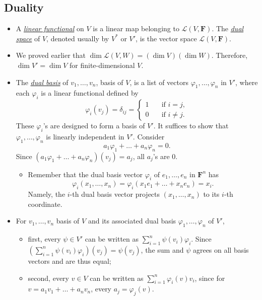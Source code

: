\documentclass[11pt]{article}
\newcommand{\df}[1]{\ul{\textit{\textsf{#1}}}}
\newcommand{\F}{\mathbf{F}}
\renewcommand{\d}{\dim}
\newcommand{\LVW}{\mathcal{L}(V,W)}
\renewcommand{\phi}{\varphi}
\begin{document}
\subsection{Duality}
\begin{itemize}
    \item A \df{linear functional} on $V$ is a linear map belonging to $\mathcal{L}(V,\F)$. The \df{dual space} of $V$, denoted usually by $V^*$ or $V'$, is the vector space $\mathcal{L}(V,\F)$.
    \item We proved earlier that $\d \LVW = (\d V)(\d W)$. Therefore, $\d V' = \d V$ for finite-dimensional $V$.
    \item The \df{dual basis} of $v_1,\dots,v_n$, basis of $V$, is a list of vectors $\phi_1,\dots,\phi_n$ in $V'$, where each $\phi_i$ is a linear functional defined by
    \begin{equation*}
        \phi_i(v_j) = \delta_{ij} = \left\{
            \begin{array}{rl}
                1 \quad & \text{if } i = j, \\
                0 \quad & \text{if } i \not= j.
            \end{array}
        \right.
    \end{equation*}
    These $\phi_i$'s are designed to form a basis of $V'$. It suffices to show that $\phi_1,\dots,\phi_n$ is linearly independent in $V'$. Consider $$a_1\phi_1+\dots+a_n\phi_n=0.$$ Since $(a_1\phi_1+\dots+a_n\phi_n)(v_j)=a_j$, all $a_j$'s are 0.
    \begin{itemize}
        \item Remember that the dual basis vector $\phi_i$ of $e_1,\dots,e_n$ in $\F^n$ has $$\phi_i(x_1,\dots,x_n)=\phi_i(x_1e_1+\dots+x_ne_n)=x_i.$$ Namely, the $i$-th dual basis vector projects $(x_1,\dots,x_n)$ to its $i$-th coordinate.
    \end{itemize}
    \item For $v_1,\dots,v_n$ basis of $V$ and its associated dual basis $\phi_1,\dots,\phi_n$ of $V'$, 
    \begin{itemize}
        \item first, every $\psi \in V'$ can be written as $\sum_{i=1}^n \psi(v_i)\phi_i$. Since $(\sum_{i=1}^n \psi(v_i)\phi_i)(v_j) = \psi(v_j)$, the sum and $\psi$ agrees on all basis vectors and are thus equal;
        \item second, every $v \in V$ can be written as $\sum_{i=1}^n \phi_i(v)v_i$, since for $v = a_1v_1 + \dots +a_nv_n$, every $a_j = \phi_j(v)$.
    \end{itemize}

\end{itemize}
\end{document}
